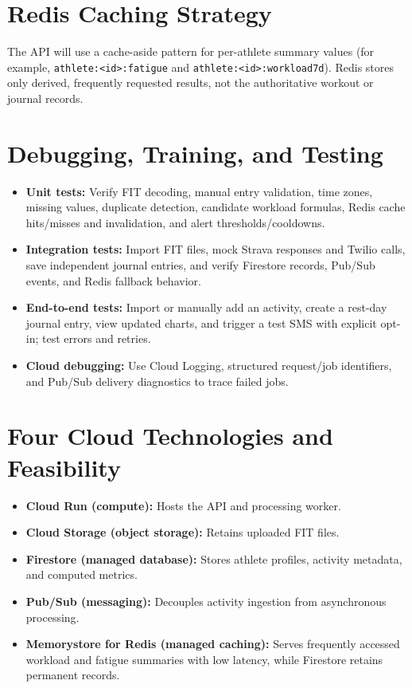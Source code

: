 \documentclass[11pt,letterpaper]{article}
\newcommand{\service}[1]{\textbf{#1}}
\begin{document}
\section{Redis Caching Strategy}
The API will use a cache-aside pattern for per-athlete summary values (for example, \texttt{athlete:<id>:fatigue} and \texttt{athlete:<id>:workload7d}). Redis stores only derived, frequently requested results, not the authoritative workout or journal records.

\section{Debugging, Training, and Testing}
\begin{itemize}
\item \textbf{Unit tests:} Verify FIT decoding, manual entry validation, time zones, missing values, duplicate detection, candidate workload formulas, Redis cache hits/misses and invalidation, and alert thresholds/cooldowns.
\item \textbf{Integration tests:} Import FIT files, mock Strava responses and Twilio calls, save independent journal entries, and verify Firestore records, Pub/Sub events, and Redis fallback behavior.
\item \textbf{End-to-end tests:} Import or manually add an activity, create a rest-day journal entry, view updated charts, and trigger a test SMS with explicit opt-in; test errors and retries.
\item \textbf{Cloud debugging:} Use Cloud Logging, structured request/job identifiers, and Pub/Sub delivery diagnostics to trace failed jobs.
\end{itemize}


\section{Four Cloud Technologies and Feasibility}
\begin{itemize}
\item \service{Cloud Run (compute):} Hosts the API and processing worker.
\item \service{Cloud Storage (object storage):} Retains uploaded FIT files.
\item \service{Firestore (managed database):} Stores athlete profiles, activity metadata, and computed metrics.
\item \service{Pub/Sub (messaging):} Decouples activity ingestion from asynchronous processing.
\item \service{Memorystore for Redis (managed caching):} Serves frequently accessed workload and fatigue summaries with low latency, while Firestore retains permanent records.
\end{itemize}
\end{document}
